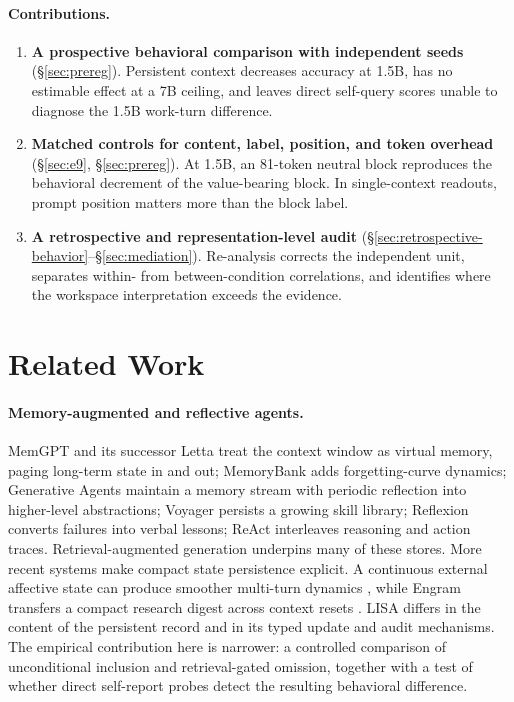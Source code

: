 \documentclass{article}
\begin{document}
\paragraph{Contributions.}
\begin{enumerate}
\item \textbf{A prospective behavioral comparison with independent seeds} (\S\ref{sec:prereg}). Persistent context decreases accuracy at 1.5B, has no estimable effect at a 7B ceiling, and leaves direct self-query scores unable to diagnose the 1.5B work-turn difference.
\item \textbf{Matched controls for content, label, position, and token overhead} (\S\ref{sec:e9}, \S\ref{sec:prereg}). At 1.5B, an 81-token neutral block reproduces the behavioral decrement of the value-bearing block. In single-context readouts, prompt position matters more than the block label.
\item \textbf{A retrospective and representation-level audit} (\S\ref{sec:retrospective-behavior}--\S\ref{sec:mediation}). Re-analysis corrects the independent unit, separates within- from between-condition correlations, and identifies where the workspace interpretation exceeds the evidence.
\end{enumerate}

\section{Related Work}
\paragraph{Memory-augmented and reflective agents.} MemGPT \citep{packer2023} and its successor Letta treat the context window as virtual memory, paging long-term state in and out; MemoryBank \citep{zhong2024memorybank} adds forgetting-curve dynamics; Generative Agents \citep{park2023} maintain a memory stream with periodic reflection into higher-level abstractions; Voyager \citep{wang2023voyager} persists a growing skill library; Reflexion \citep{shinn2023} converts failures into verbal lessons; ReAct \citep{yao2023react} interleaves reasoning and action traces. Retrieval-augmented generation \citep{lewis2020rag} underpins many of these stores. More recent systems make compact state persistence explicit. A continuous external affective state can produce smoother multi-turn dynamics \citep{subaharan2026state}, while Engram transfers a compact research digest across context resets \citep{karimi2026engram}. LISA differs in the content of the persistent record and in its typed update and audit mechanisms. The empirical contribution here is narrower: a controlled comparison of unconditional inclusion and retrieval-gated omission, together with a test of whether direct self-report probes detect the resulting behavioral difference.
\end{document}
